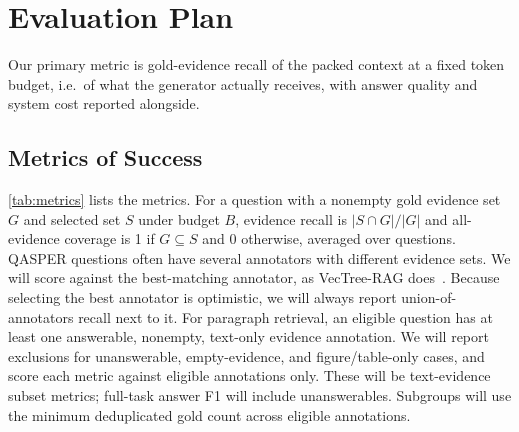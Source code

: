 \documentclass[sigconf, nonacm]{acmart}
\begin{document}
\section{Evaluation Plan}

Our primary metric is gold-evidence recall of the packed context at a fixed token budget, i.e.\ of what the generator actually receives, with answer quality and system cost reported alongside.

\subsection{Metrics of Success}

\autoref{tab:metrics} lists the metrics. For a question with a nonempty gold evidence set $G$ and selected set $S$ under budget $B$, evidence recall is $|S \cap G| / |G|$ and all-evidence coverage is 1 if $G \subseteq S$ and 0 otherwise, averaged over questions. QASPER questions often have several annotators with different evidence sets. We will score against the best-matching annotator, as VecTree-RAG does~\cite{zhong2026vectree}. Because selecting the best annotator is optimistic, we will always report union-of-annotators recall next to it. For paragraph retrieval, an eligible question has at least one answerable, nonempty, text-only evidence annotation. We will report exclusions for unanswerable, empty-evidence, and figure/table-only cases, and score each metric against eligible annotations only. These will be text-evidence subset metrics; full-task answer F1 will include unanswerables. Subgroups will use the minimum deduplicated gold count across eligible annotations.
\end{document}
